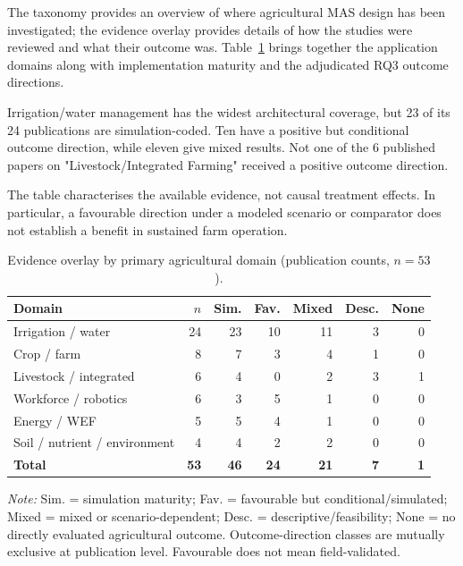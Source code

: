 \documentclass[11pt,a4paper]{article}
\begin{document}
The taxonomy provides an overview of where agricultural MAS design has been investigated; the evidence overlay provides details of how the studies were reviewed and what their outcome was. Table~\ref{tab:mas_domain_outcome} brings together the application domains along with implementation maturity and the adjudicated RQ3 outcome directions.

Irrigation/water management has the widest architectural
coverage, but 23 of its 24 publications are simulation-coded. Ten
have a positive but conditional outcome direction, while eleven give
mixed results. Not one of the 6 published papers on "Livestock/Integrated Farming" received a positive outcome direction.

The table characterises the available evidence, not causal treatment
effects. In particular, a favourable direction under a modeled
scenario or comparator does not establish a benefit in sustained farm
operation.

\begin{table}[H]
\centering
\scriptsize
\caption{Evidence overlay by primary agricultural domain (publication counts, $n=53$).}
\label{tab:mas_domain_outcome}
\setlength{\tabcolsep}{3.4pt}
\begin{tabularx}{\textwidth}{@{}>{\raggedright\arraybackslash}Xrrrrrr@{}}
\toprule
\textbf{Domain} & \textbf{$n$} & \textbf{Sim.} & \textbf{Fav.} &
\textbf{Mixed} & \textbf{Desc.} & \textbf{None} \\
\midrule
Irrigation / water & 24 & 23 & 10 & 11 & 3 & 0 \\
Crop / farm & 8 & 7 & 3 & 4 & 1 & 0 \\
Livestock / integrated & 6 & 4 & 0 & 2 & 3 & 1 \\
Workforce / robotics & 6 & 3 & 5 & 1 & 0 & 0 \\
Energy / WEF & 5 & 5 & 4 & 1 & 0 & 0 \\
Soil / nutrient / environment & 4 & 4 & 2 & 2 & 0 & 0 \\
\midrule
\textbf{Total} & \textbf{53} & \textbf{46} & \textbf{24} &
\textbf{21} & \textbf{7} & \textbf{1} \\
\bottomrule
\end{tabularx}
\par\smallskip
\footnotesize\emph{Note:} Sim. = simulation maturity; Fav. = favourable
but conditional/simulated; Mixed = mixed or scenario-dependent;
Desc. = descriptive/feasibility; None = no directly evaluated
agricultural outcome. Outcome-direction classes are mutually exclusive
at publication level. Favourable does not mean field-validated.
\end{table}
\end{document}

